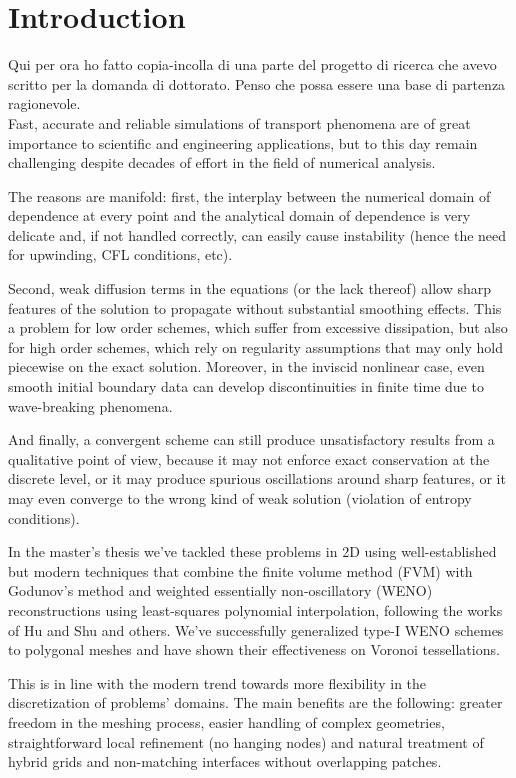 \chapter*{Introduction} \label{ch:introduction}
{}

{\color{blue} Qui per ora ho fatto copia-incolla di una parte del progetto
di ricerca che avevo scritto per la domanda di dottorato.
Penso che possa essere una base di partenza ragionevole.}\\

Fast, accurate and reliable simulations of transport phenomena are of great
importance to scientific and engineering applications, but to this day remain
challenging despite decades of effort in the field of numerical analysis.

The reasons are manifold: first, the interplay between the numerical domain
of dependence at every point and the analytical domain of dependence is very
delicate and, if not handled correctly, can easily cause instability
(hence the need for upwinding, CFL conditions, etc).

Second, weak diffusion terms in the equations (or the lack thereof) allow
sharp features of the solution to propagate without substantial smoothing
effects. This a problem for low order schemes, which suffer from excessive
dissipation, but also for high order schemes, which rely on regularity
assumptions that may only hold piecewise on the exact solution.
Moreover, in the inviscid nonlinear case, even smooth initial boundary
data can develop discontinuities in finite time due to wave-breaking phenomena.

And finally, a convergent scheme can still produce unsatisfactory results
from a qualitative point of view, because it may not enforce exact
conservation at the discrete level, or it may produce spurious oscillations
around sharp features, or it may even converge to the wrong kind of weak
solution (violation of entropy conditions).

In the master’s thesis we’ve tackled these problems in 2D using
well-established but modern techniques that combine the finite volume
method (FVM) with Godunov’s method and weighted essentially
non-oscillatory (WENO) reconstructions using least-squares polynomial
interpolation, following the works of Hu and Shu and others.
We’ve successfully generalized type-I WENO schemes to polygonal
meshes and have shown their effectiveness on Voronoi tessellations.

This is in line with the modern trend towards more flexibility in the
discretization of problems’ domains. The main benefits are the
following: greater freedom in the meshing process, easier handling
of complex geometries, straightforward local refinement (no hanging
nodes) and natural treatment of hybrid grids and non-matching
interfaces without overlapping patches.